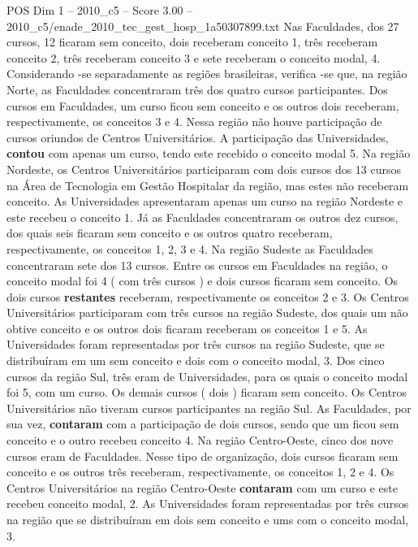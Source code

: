 \begin{textsample}{POS Dim 1 – 2010\_c5 – Score 3.00 – 2010\_c5/enade\_2010\_tec\_gest\_hosp\_1a50307899.txt}
Nas Faculdades, dos 27 cursos, 12 ficaram sem conceito, dois receberam conceito 1, três receberam conceito 2, três receberam conceito 3 e sete receberam o conceito modal, 4.
Considerando -se separadamente as regiões brasileiras, verifica -se que, na região Norte, as Faculdades concentraram três dos quatro cursos participantes.
Dos cursos em Faculdades, um curso ficou sem conceito e os outros dois receberam, respectivamente, os conceitos 3 e 4.
Nessa região não houve participação de cursos oriundos de Centros Universitários.
A participação das Universidades, \textbf{contou} com apenas um curso, tendo este recebido o conceito modal 5.
Na região Nordeste, os Centros Universitários participaram com dois cursos dos 13 cursos na Área de Tecnologia em Gestão Hospitalar da região, mas estes não receberam conceito.
As Universidades apresentaram apenas um curso na região Nordeste e este recebeu o conceito 1.
Já as Faculdades concentraram os outros dez cursos, dos quais seis ficaram sem conceito e os outros quatro receberam, respectivamente, os conceitos 1, 2, 3 e 4.
Na região Sudeste as Faculdades concentraram sete dos 13 cursos.
Entre os cursos em Faculdades na região, o conceito modal foi 4 ( com três cursos ) e dois cursos ficaram sem conceito.
Os dois cursos \textbf{restantes} receberam, respectivamente os conceitos 2 e 3.
Os Centros Universitários participaram com três cursos na região Sudeste, dos quais um não obtive conceito e os outros dois ficaram receberam os conceitos 1 e 5.
As Universidades foram representadas por três cursos na região Sudeste, que se distribuíram em um sem conceito e dois com o conceito modal, 3.
Dos cinco cursos da região Sul, três eram de Universidades, para os quais o conceito modal foi 5, com um curso.
Os demais cursos ( dois ) ficaram sem conceito.
Os Centros Universitários não tiveram cursos participantes na região Sul.
As Faculdades, por sua vez, \textbf{contaram} com a participação de dois cursos, sendo que um ficou sem conceito e o outro recebeu conceito 4.
Na região Centro-Oeste, cinco dos nove cursos eram de Faculdades.
Nesse tipo de organização, dois cursos ficaram sem conceito e os outros três receberam, respectivamente, os conceitos 1, 2 e 4.
Os Centros Universitários na região Centro-Oeste \textbf{contaram} com um curso e este recebeu conceito modal, 2.
As Universidades foram representadas por três cursos na região que se distribuíram em dois sem conceito e ums com o conceito modal, 3.

\end{textsample}
